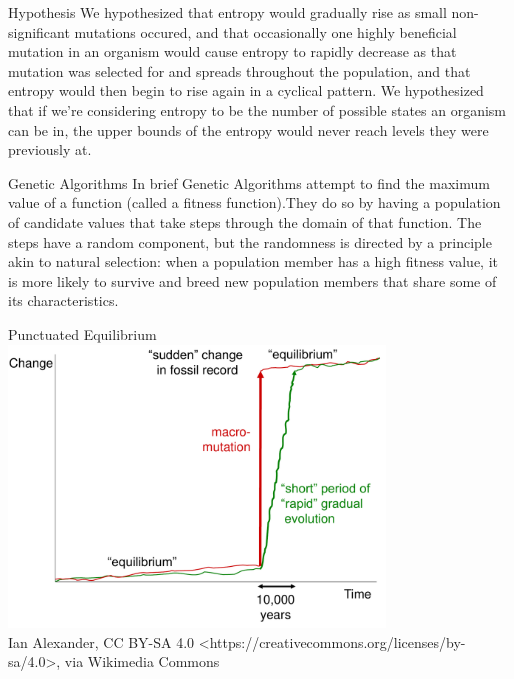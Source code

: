 \documentclass[10pt,aspectratio=169]{beamer}
\begin{document}
\begin{frame}{Hypothesis}
	We hypothesized that entropy would gradually rise as small non-significant
	mutations occured, and that occasionally one highly beneficial mutation in
	an organism would cause entropy to rapidly decrease as that mutation was
	selected for and spreads throughout the population, and that entropy would then
	begin to rise again in a cyclical pattern. We hypothesized that if we're considering
	entropy to be the number of possible states an organism can be in, the
	upper bounds of the entropy would never reach levels they were previously at.
\end{frame}

\begin{frame}{Genetic Algorithms}
	In brief Genetic Algorithms attempt to find the maximum value of a
	function (called a fitness function).They do so by having a population of candidate values that take steps through the domain of that function.  The steps have a random	component, but the randomness is directed by a principle akin to	natural selection: when a population member has a high fitness value,	it is more likely to survive and breed new population members that share some of its characteristics.
	\begin{center}
	\end{center}
\end{frame}

\begin{frame}{Punctuated Equilibrium}
      	\centering
      	      \includegraphics[width=0.75\textwidth]{Punctuated_Equilibrium.pdf}\\
      	      \tiny Ian Alexander, CC BY-SA 4.0 <https://creativecommons.org/licenses/by-sa/4.0>, via Wikimedia Commons
\end{frame}
\end{document}
